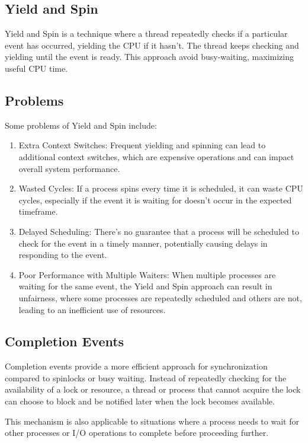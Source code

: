 \documentclass{report}
\begin{document}
\subsection{Yield and Spin}
Yield and Spin is a technique where a thread repeatedly checks if a particular event has
occurred, yielding the CPU if it hasn't. The thread keeps checking and yielding until the event is
ready. This approach avoid busy-waiting, maximizing useful CPU time.


\subsection*{Problems}
Some problems of Yield and Spin include: 

\begin{enumerate}[label=\textit{(\roman*)}]
\item Extra Context Switches: Frequent yielding and spinning can lead to additional context
  switches, which are expensive operations and can impact overall system performance.
\item Wasted Cycles: If a process spins every time it is scheduled, it can waste CPU cycles,
  especially if the event it is waiting for doesn't occur in the expected timeframe.
\item Delayed Scheduling: There's no guarantee that a process will be scheduled to check for the
  event in a timely manner, potentially causing delays in responding to the event.
\item Poor Performance with Multiple Waiters: When multiple processes are waiting for the same
  event, the Yield and Spin approach can result in unfairness, where some processes are repeatedly
  scheduled and others are not, leading to an inefficient use of resources.
\end{enumerate}


\subsection{Completion Events}
Completion events provide a more efficient approach for synchronization compared to spinlocks or
busy waiting. Instead of repeatedly checking for the availability of a lock or resource, a thread or
process that cannot acquire the lock can choose to block and be notified later when the lock becomes
available.

This mechanism is also applicable to situations where a process needs to wait for other
processes or I/O operations to complete before proceeding further.
\end{document}

